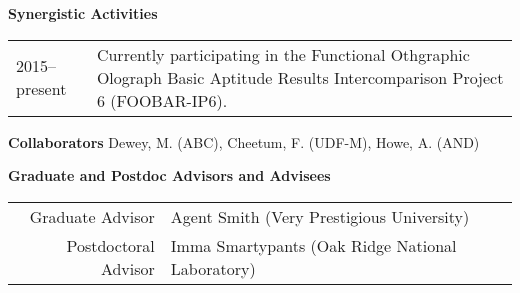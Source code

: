 \noindent\textbf{Synergistic Activities} %

\vspace{1.5em}
\begin{tabular}{lp{5.2in}}
    2015--present & Currently participating in the Functional Othgraphic Olograph Basic Aptitude Results Intercomparison Project 6 (FOOBAR-IP6). \\[0.5em] 

\end{tabular}
\vspace{1.5em}

\noindent\textbf{Collaborators}
    Dewey, M. (ABC),
    Cheetum, F. (UDF-M),
    Howe, A. (AND)

\vspace{1.5em}
\noindent\textbf{Graduate and Postdoc Advisors and Advisees}
\vspace{1.5em}

\begin{tabular}{rp{5.6in}}
    Graduate Advisor & Agent Smith (Very Prestigious University)  \\
    Postdoctoral Advisor & Imma Smartypants (Oak Ridge National Laboratory) \\
\end{tabular}



